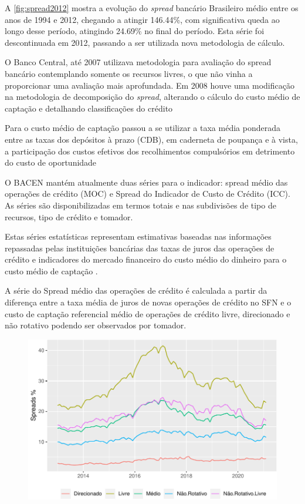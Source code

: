 \documentclass[12pt,openright,oneside,a4paper,chapter=TITLE,section=TITLE,subsection=TITLE,english,french,spanish,portugues,sumario=tradicional]{abntex2}
\begin{document}
A \autoref{fig:spread2012} mostra a evolução do \emph{spread} bancário Brasileiro
médio entre os anos de 1994 e 2012, chegando a atingir 146.44\%, com
significativa queda ao longo desse período, atingindo 24.69\% no final
do período. Esta série foi descontinuada em 2012, passando a ser utilizada nova
metodologia de cálculo.

O Banco Central, até 2007 utilizava metodologia para avaliação do spread
bancário contemplando somente os recursos livres, o que não vinha a
proporcionar uma avaliação mais aprofundada. Em 2008 houve uma modificação na
metodologia de decomposição do \emph{spread}, alterando o cálculo do custo médio de
captação e detalhando classificações do crédito \cite{dantas:2012}

Para o custo médio de captação passou a se utilizar a taxa média ponderada
entre as taxas dos depósitos à prazo (CDB), em caderneta de poupança e à vista,
a participação dos custos efetivos dos recolhimentos compulsórios em detrimento
do custo de oportunidade \cite{dantas:2012}

O BACEN mantém atualmente duas séries para o indicador: spread médio das
operações de crédito (MOC) e Spread do Indicador de Custo de Crédito (ICC). As
séries são disponibilizadas em termos totais e nas subdivisões de tipo de
recursos, tipo de crédito e tomador.

Estas séries estatísticas representam estimativas baseadas nas informações
repassadas pelas instituições bancárias das taxas de juros das operações de
crédito e indicadores do mercado financeiro do custo médio do dinheiro para o
custo médio de captação \cite{BCB:2016}.

A série do Spread médio das operações de crédito é calculada a partir da
diferença entre a taxa média de juros de novas operações de crédito no SFN e o
custo de captação referencial médio de operações de crédito livre, direcionado
e não rotativo podendo ser observados por tomador.

\begin{figure}

\begin{center}\includegraphics{12-exportedfigures/spread 2019 moc-1} \end{center}
\label{fig:spreadmoc}
\end{figure}
\end{document}
